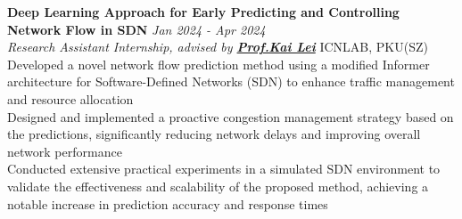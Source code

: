\documentclass[a4paper,8pt]{article}
\begin{document}
\textbf{Deep Learning Approach for Early Predicting and Controlling Network Flow in SDN} \hfill \textit{Jan 2024 - Apr 2024}\\
\textit{Research Assistant Internship, advised by \textbf{\href{https://scholar.google.com/citations?user=xOs3daIAAAAJ&hl=en}{Prof.\@ Kai Lei}}} \hfill ICNLAB, PKU(SZ)\\
\textbullet Developed a novel network flow prediction method using a modified Informer architecture for Software-Defined Networks (SDN) to enhance traffic management and resource allocation\\
\textbullet Designed and implemented a proactive congestion management strategy based on the predictions, significantly reducing network delays and improving overall network performance\\
\textbullet Conducted extensive practical experiments in a simulated SDN environment to validate the effectiveness and scalability of the proposed method, achieving a notable increase in prediction accuracy and response times
\end{document}
